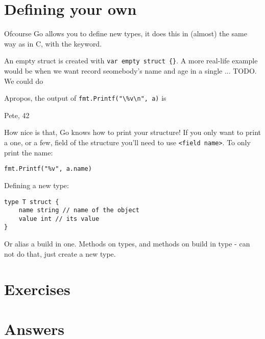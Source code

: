 \section{Defining your own}
\label{sec:defining your own}
Ofcourse Go allows you to define new types, it does this in (almost) the
same way as in C, with the  keyword.

An empty struct is created with \lstinline|var empty struct {}|{}.
A more real-life example would be when we want record seomebody's name
and age in a single ... TODO. We could do



Apropos, the output of \lstinline{fmt.Printf("\%v\n", a)} is 
\begin{display}
{Pete, 42}
\end{display}
How nice is that, Go knows how to print your structure! If you
only want to print a one, or a few, field of the structure you'll
need to use \verb|<field name>|. To only print the name:
\begin{lstlisting}
fmt.Printf("%v", a.name)
\end{lstlisting}

Defining a new type:

\begin{lstlisting}
type T struct {
    name string // name of the object
    value int // its value
}
\end{lstlisting}

Or alias a build in one.
Methods on types, and methods on build in type - can not do that,
just create a new type.

\section{Exercises}




\cleardoublepage
\section{Answers}
\shipoutAnswer
